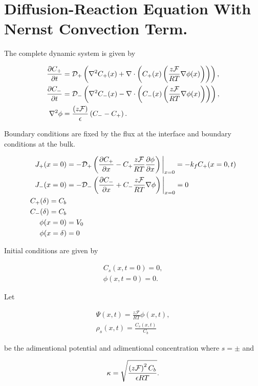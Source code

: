 \section{Diffusion-Reaction Equation With Nernst Convection Term.}


The complete dynamic system is given by

\begin{align} \label{eq:diffusion-nernst}
\frac{\partial C_+}{\partial t} &= \mathcal{D_+}\left(\nabla^2 C_+(x) +\nabla \cdot \left({C_+(x)\left({\frac{z \mathcal{F}}{RT}\nabla\phi(x)}\right)}\right)\right), \\
\frac{\partial C_-}{\partial t} &= \mathcal{D_-}\left(\nabla^2 C_-(x) -\nabla \cdot \left({C_-(x)\left({\frac{z \mathcal{F}}{RT}\nabla\phi(x)}\right)}\right)\right),\\
	\nabla^2 \phi &= \frac{\left({z\mathcal{F}}\right)}{\epsilon}\left({C_- - C_+}\right).
\end{align}

Boundary conditions are fixed by the flux at the interface and boundary conditions at the bulk.

\begin{align}
    J_+(x = 0) &= -\mathcal{D}_+\left({\frac{\partial C_+}{\partial x} - C_+ \frac{z\mathcal{F}}{RT}\frac{\partial\phi}{\partial x}}\right)\bigg|_{x= 0}= -k_f C_+(x = 0, t)\\
    J_-(x = 0) &= -\mathcal{D}_-\left({\frac{\partial C_-}{\partial x} + C_- \frac{z\mathcal{F}}{RT}\nabla\phi}\right) \bigg|_{x= 0} = 0\\
    C_+(\delta) = C_b\\
    C_-(\delta) = C_b\\
    \phi(x = 0) &= V_0\\
    \phi(x = \delta) &= 0
\end{align}

Initial conditions are given by

\begin{align}
	C_s(x, t=0) = 0,\\
	\phi (x,t=0) = 0.
\end{align}

Let 

\begin{align}
	\Psi(x, t) = \frac{z\mathcal{F}}{RT}\phi(x, t), \\
	\rho_s(x, t) = \frac{C_s(x, t)}{C_b}
\end{align}

be the adimentional potential and adimentional concentration where $s=\pm$ and 

\begin{align}
	\kappa = \sqrt{\frac{\left({z\mathcal{F}}\right)^2C_b}{\epsilon RT}}.
\end{align}

